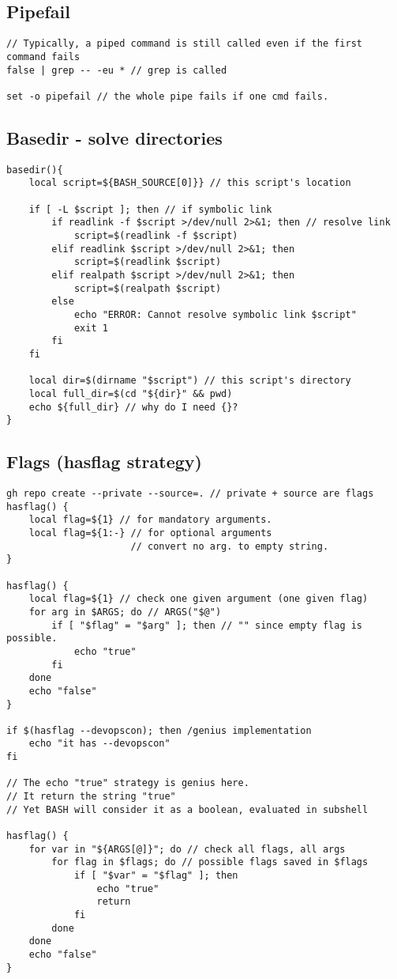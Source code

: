 \subsection{Pipefail}

\begin{verbatim}
// Typically, a piped command is still called even if the first command fails
false | grep -- -eu * // grep is called

set -o pipefail // the whole pipe fails if one cmd fails. 
\end{verbatim}

\subsection{Basedir - solve directories}

\begin{verbatim}
basedir(){
    local script=${BASH_SOURCE[0]}} // this script's location

    if [ -L $script ]; then // if symbolic link
        if readlink -f $script >/dev/null 2>&1; then // resolve link
            script=$(readlink -f $script)
        elif readlink $script >/dev/null 2>&1; then
            script=$(readlink $script)
        elif realpath $script >/dev/null 2>&1; then
            script=$(realpath $script)
        else
            echo "ERROR: Cannot resolve symbolic link $script"
            exit 1 
        fi
    fi

    local dir=$(dirname "$script") // this script's directory
    local full_dir=$(cd "${dir}" && pwd)
    echo ${full_dir} // why do I need {}?
}
\end{verbatim}

\subsection{Flags (hasflag strategy)}

\begin{verbatim}
gh repo create --private --source=. // private + source are flags
hasflag() {
    local flag=${1} // for mandatory arguments. 
    local flag=${1:-} // for optional arguments
                      // convert no arg. to empty string. 
}

hasflag() {
    local flag=${1} // check one given argument (one given flag)
    for arg in $ARGS; do // ARGS("$@")
        if [ "$flag" = "$arg" ]; then // "" since empty flag is possible.
            echo "true"
        fi
    done
    echo "false"
}

if $(hasflag --devopscon); then /genius implementation
    echo "it has --devopscon"
fi

// The echo "true" strategy is genius here. 
// It return the string "true"
// Yet BASH will consider it as a boolean, evaluated in subshell

hasflag() {
    for var in "${ARGS[@]}"; do // check all flags, all args
        for flag in $flags; do // possible flags saved in $flags
            if [ "$var" = "$flag" ]; then
                echo "true"
                return
            fi
        done
    done
    echo "false"
}
\end{verbatim}

